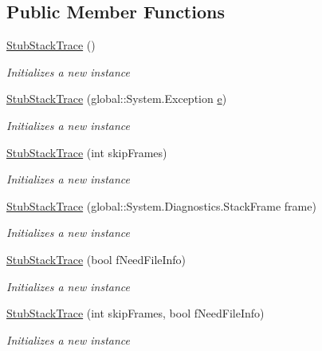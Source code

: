 \subsection*{Public Member Functions}
\begin{DoxyCompactItemize}
\item 
\hyperlink{class_system_1_1_diagnostics_1_1_fakes_1_1_stub_stack_trace_a003ce618033b5c1ccfdf8846079c1b8a}{Stub\-Stack\-Trace} ()
\begin{DoxyCompactList}\small\item\em Initializes a new instance\end{DoxyCompactList}\item 
\hyperlink{class_system_1_1_diagnostics_1_1_fakes_1_1_stub_stack_trace_a8f1b6c928f16816a7dfcfeda62f56309}{Stub\-Stack\-Trace} (global\-::\-System.\-Exception \hyperlink{jquery-1_810_82_8min_8js_a2c038346d47955cbe2cb91e338edd7e1}{e})
\begin{DoxyCompactList}\small\item\em Initializes a new instance\end{DoxyCompactList}\item 
\hyperlink{class_system_1_1_diagnostics_1_1_fakes_1_1_stub_stack_trace_a4c8dad59cf4fee2bf1bcc03c065bb07c}{Stub\-Stack\-Trace} (int skip\-Frames)
\begin{DoxyCompactList}\small\item\em Initializes a new instance\end{DoxyCompactList}\item 
\hyperlink{class_system_1_1_diagnostics_1_1_fakes_1_1_stub_stack_trace_a6739b346404fbd230279a54f726f6b66}{Stub\-Stack\-Trace} (global\-::\-System.\-Diagnostics.\-Stack\-Frame frame)
\begin{DoxyCompactList}\small\item\em Initializes a new instance\end{DoxyCompactList}\item 
\hyperlink{class_system_1_1_diagnostics_1_1_fakes_1_1_stub_stack_trace_a68b8439e54d4feeae12516befb74a6b1}{Stub\-Stack\-Trace} (bool f\-Need\-File\-Info)
\begin{DoxyCompactList}\small\item\em Initializes a new instance\end{DoxyCompactList}\item 
\hyperlink{class_system_1_1_diagnostics_1_1_fakes_1_1_stub_stack_trace_a944faba14935d0469389a1d5b5f10884}{Stub\-Stack\-Trace} (int skip\-Frames, bool f\-Need\-File\-Info)
\begin{DoxyCompactList}\small\item\em Initializes a new instance\end{DoxyCompactList}\item 

\end{DoxyCompactItemize}
